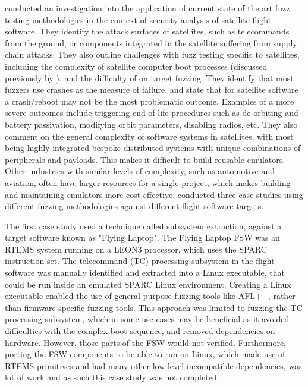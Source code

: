 \documentclass[../report.tex]{subfiles}
\begin{document}
\citet{Willbold_2024} conducted an investigation into the application of
current state of the art fuzz testing methodologies in the context of security
analysis of satellite flight software. They identify the attack surfaces of
satellites, such as telecommands from the ground, or components integrated in
the satellite suffering from supply chain attacks. They also outline
challenges with fuzz testing specific to satellites, including the complexity
of satellite computer boot processes (discussed previously by
\citet{Scharnowski_2023}), and the difficulty of on target fuzzing. They
identify that most fuzzers use crashes as the measure of failure, and state
that for satellite software a crash/reboot may not be the most problematic
outcome. Examples of a more severe outcomes include triggering end of life
procedures such as de-orbiting and battery passivation, modifying orbit
parameters, disabling radios, etc. They also comment on the general complexity
of software systems in satellites, with most being highly integrated bespoke
distributed systems with unique combinations of peripherals and payloads. This
makes it difficult to build reusable emulators. Other industries with similar
levels of complexity, such as automotive and aviation, often have larger
resources for a single project, which makes building and maintaining emulators
more cost effective. \citet{Willbold_2024} conducted three case studies using
different fuzzing methodologies against different flight software targets.

The first case study used a technique called subsystem extraction, against a
target software known as "Flying Laptop". The Flying Laptop FSW was an RTEMS
system running on a LEON3 processor, which uses the SPARC instruction set. The
telecommand (TC) processing subsystem in the flight software was manually
identified and extracted into a Linux executable, that could be run inside an
emulated SPARC Linux environment. Creating a Linux executable enabled the use
of general purpose fuzzing tools like AFL++, rather than firmware specific
fuzzing tools. This approach was limited to fuzzing the TC processing
subsystem, which in some use cases may be beneficial as it avoided difficulties
with the complex boot sequence, and removed dependencies on hardware. However,
those parts of the FSW would not verified. Furthermore, porting the FSW
components to be able to run on Linux, which made use of RTEMS primitives and
had many other low level incompatible dependencies, was lot of work and as such
this case study was not completed \citep{Willbold_2024}.
\end{document}
